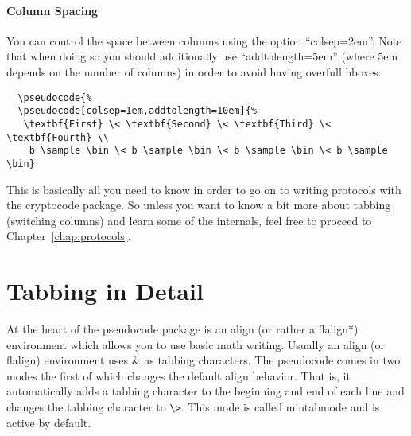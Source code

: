 \documentclass[a4paper]{report}
\begin{document}
  \paragraph{Column Spacing}
  You can control the space between columns using the option \enquote{colsep=2em}. Note that when doing so you should
  additionally use \enquote{addtolength=5em} (where 5em depends on the number of columns) in order to avoid having
  overfull hboxes.
  \begin{center}
  \end{center}
  \begin{lstlisting}
  \pseudocode{%
  \pseudocode[colsep=1em,addtolength=10em]{%
   \textbf{First} \< \textbf{Second} \< \textbf{Third} \< \textbf{Fourth} \\
	b \sample \bin \< b \sample \bin \< b \sample \bin \< b \sample \bin}
  \end{lstlisting}
  
  This is basically all you need to know in order to go on to writing protocols with the
  cryptocode package. So unless you want to know a bit more about tabbing (switching columns)
  and learn some of the internals, feel free to proceed to Chapter~\ref{chap:protocols}.
  
  
  \section{Tabbing in Detail}
  At the heart of the pseudocode package is an align (or rather a flalign*) environment which allows you to use basic math writing. Usually an align (or flalign) environment uses \& as tabbing characters. The pseudocode comes in two modes the first of which changes the default align behavior. That is, it automatically adds a tabbing character to the beginning and end of each line and changes the tabbing character to \lstinline$\>$. This mode is called mintabmode and is active by default.
  
\end{document}
